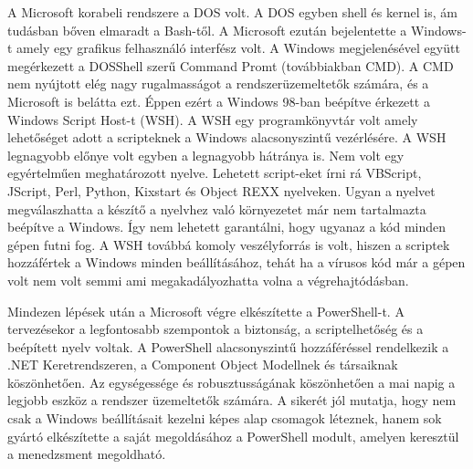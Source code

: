 \documentclass[12pt,oneside,justify,table]{book}
\begin{document}
A Microsoft korabeli rendszere a DOS volt. A DOS egyben shell és kernel is, ám tudásban bőven elmaradt a Bash-től. A Microsoft ezután bejelentette a Windows-t amely egy grafikus felhasználó interfész volt. A Windows megjelenésével együtt megérkezett a DOSShell szerű Command Promt (továbbiakban CMD). 
A CMD nem nyújtott elég nagy rugalmasságot a rendszerüzemeltetők számára, és a Microsoft is belátta ezt. Éppen ezért a Windows 98-ban beépítve érkezett a Windows Script Host-t (WSH). A WSH egy programkönyvtár volt amely lehetőséget adott a scripteknek a Windows alacsonyszintű vezérlésére.
A WSH legnagyobb előnye volt egyben a legnagyobb hátránya is. Nem volt egy egyértelműen meghatározott nyelve. Lehetett script-eket írni rá VBScript, JScript, Perl, Python, Kixstart és Object REXX nyelveken. Ugyan a nyelvet megválaszhatta a készítő a nyelvhez való környezetet már nem tartalmazta beépítve a Windows. Így nem lehetett garantálni, hogy ugyanaz a kód minden gépen futni fog. A WSH továbbá komoly veszélyforrás is volt, hiszen a scriptek hozzáfértek a Windows minden beállításához, tehát ha a vírusos kód már a gépen volt nem volt semmi ami megakadályozhatta volna a végrehajtódásban.

Mindezen lépések után a Microsoft végre elkészítette a PowerShell-t. A tervezésekor a legfontosabb szempontok a biztonság, a scriptelhetőség és a beépített nyelv voltak. A PowerShell alacsonyszintű hozzáféréssel rendelkezik a .NET Keretrendszeren, a Component Object Modellnek és társaiknak köszönhetően. Az egységessége és robusztusságának köszönhetően a mai napig a legjobb eszköz a rendszer üzemeltetők számára. A sikerét jól mutatja, hogy nem csak a Windows beállításait kezelni képes alap csomagok léteznek, hanem sok gyártó elkészítette a saját megoldásához a PowerShell modult, amelyen keresztül a menedzsment megoldható.
\cite{WindowsPowerShellUnleashed}
\end{document}
